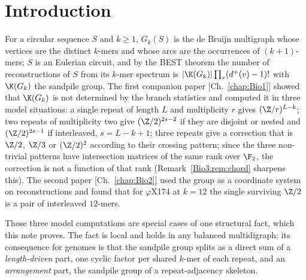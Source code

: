 \section{Introduction}\label{Bio3:sec:intro}

For a circular sequence $S$ and $k\ge1$, $G_k(S)$ is the de Bruijn multigraph whose
vertices are the distinct $k$-mers and whose arcs are the occurrences of $(k{+}1)$-mers;
$S$ is an Eulerian circuit, and by the BEST theorem \cite{AEdB,SmithTutte} the number of
reconstructions of $S$ from its $k$-mer spectrum is $|\K(G_k)|\prod_v(d^+(v)-1)!$ with
$\K(G_k)$ the sandpile group. The first companion paper [Ch.~\ref{chap:Bio1}] showed that $\K(G_k)$
is not determined by the branch statistics and computed it in three model situations: a
single repeat of length $L$ and multiplicity $r$ gives $(\Z/r)^{L-k}$; two repeats of
multiplicity two give $(\Z/2)^{2s-2}$ if they are disjoint or nested and $(\Z/2)^{2s-1}$ if
interleaved, $s=L-k+1$; three repeats give a correction that is $\Z/2$, $\Z/3$ or
$(\Z/2)^{2}$ according to their crossing pattern; since the three non-trivial patterns
have intersection matrices of the same rank over $\F_2$, the correction is not a function
of that rank (Remark~\ref{Bio3:rem:chord} sharpens this). The second
paper [Ch.~\ref{chap:Bio2}] used the group as a coordinate system on reconstructions and found that
for $\varphi$X174 at $k=12$ the single surviving $\Z/2$ is a pair of interleaved
$12$-mers.

Those three model computations are special cases of one structural fact, which this note
proves. The fact is local and holds in any balanced multidigraph; its consequence for
genomes is that the sandpile group splits as a direct sum of a \emph{length-driven} part,
one cyclic factor per shared $k$-mer of each repeat, and an \emph{arrangement} part, the
sandpile group of a repeat-adjacency skeleton.

